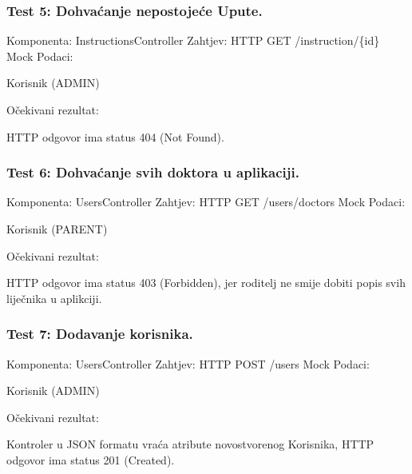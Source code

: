 			\subsubsection*{Test 5: Dohvaćanje nepostojeće Upute.}
			Komponenta: InstructionsController \newline
			Zahtjev: HTTP GET /instruction/\{id\} \newline
			Mock Podaci:
			\begin{packed_item}
				\item Korisnik (ADMIN)
			\end{packed_item}
			Očekivani rezultat:
			\begin{packed_item}
				\item HTTP odgovor ima status 404 (Not Found).
			\end{packed_item}
			

			\subsubsection*{Test 6: Dohvaćanje svih doktora u aplikaciji.}
			Komponenta: UsersController \newline
			Zahtjev: HTTP GET /users/doctors \newline
			Mock Podaci:
			\begin{packed_item}
				\item Korisnik (PARENT)
			\end{packed_item}
			Očekivani rezultat:
			\begin{packed_item}
				\item HTTP odgovor ima status 403 (Forbidden), jer roditelj ne smije dobiti popis svih liječnika u aplikciji.
			\end{packed_item}
			
			
			\subsubsection*{Test 7: Dodavanje korisnika.}
			Komponenta: UsersController \newline
			Zahtjev: HTTP POST /users \newline
			Mock Podaci:
			\begin{packed_item}
				\item Korisnik (ADMIN)
			\end{packed_item}
			Očekivani rezultat:
			\begin{packed_item}
				\item Kontroler u JSON formatu vraća atribute novostvorenog Korisnika, HTTP odgovor ima status 201 (Created).
			\end{packed_item}
			

